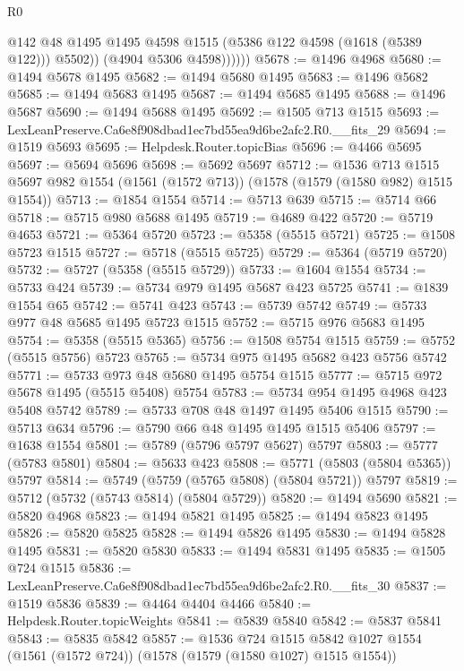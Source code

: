 \begin{lexlean}{R0}
\begin{coremodule}
                  @142
                  @48
                  @1495
                  @1495
                  @4598
                  @1515
                  (@5386 @122 @4598 (@1618 (@5389 @122)))
                  @5502))
              (@4904 @5306 @4598))))))
@5678 := @1496 @4968
@5680 := @1494 @5678 @1495
@5682 := @1494 @5680 @1495
@5683 := @1496 @5682
@5685 := @1494 @5683 @1495
@5687 := @1494 @5685 @1495
@5688 := @1496 @5687
@5690 := @1494 @5688 @1495
@5692 := @1505 @713 @1515
@5693 := LexLeanPreserve.Ca6e8f908dbad1ec7bd55ea9d6be2afc2.R0.__fits_29
@5694 := @1519 @5693
@5695 := Helpdesk.Router.topicBias
@5696 := @4466 @5695
@5697 := @5694 @5696
@5698 := @5692 @5697
@5712 := @1536
    @713
    @1515
    @5697
    @982
    @1554
    (@1561 (@1572 @713))
    (@1578 (@1579 (@1580 @982) @1515 @1554))
@5713 := @1854 @1554
@5714 := @5713 @639
@5715 := @5714 @66
@5718 := @5715 @980 @5688 @1495
@5719 := @4689 @422
@5720 := @5719 @4653
@5721 := @5364 @5720
@5723 := @5358 (@5515 @5721)
@5725 := @1508 @5723 @1515
@5727 := @5718 (@5515 @5725)
@5729 := @5364 (@5719 @5720)
@5732 := @5727 (@5358 (@5515 @5729))
@5733 := @1604 @1554
@5734 := @5733 @424
@5739 := @5734 @979 @1495 @5687 @423 @5725
@5741 := @1839 @1554 @65
@5742 := @5741 @423
@5743 := @5739 @5742
@5749 := @5733 @977 @48 @5685 @1495 @5723 @1515
@5752 := @5715 @976 @5683 @1495
@5754 := @5358 (@5515 @5365)
@5756 := @1508 @5754 @1515
@5759 := @5752 (@5515 @5756) @5723
@5765 := @5734 @975 @1495 @5682 @423 @5756 @5742
@5771 := @5733 @973 @48 @5680 @1495 @5754 @1515
@5777 := @5715 @972 @5678 @1495 (@5515 @5408) @5754
@5783 := @5734 @954 @1495 @4968 @423 @5408 @5742
@5789 := @5733 @708 @48 @1497 @1495 @5406 @1515
@5790 := @5713 @634
@5796 := @5790 @66 @48 @1495 @1495 @1515 @5406
@5797 := @1638 @1554
@5801 := @5789 (@5796 @5797 @5627) @5797
@5803 := @5777 (@5783 @5801)
@5804 := @5633 @423
@5808 := @5771 (@5803 (@5804 @5365)) @5797
@5814 := @5749 (@5759 (@5765 @5808) (@5804 @5721)) @5797
@5819 := @5712 (@5732 (@5743 @5814) (@5804 @5729))
@5820 := @1494 @5690
@5821 := @5820 @4968
@5823 := @1494 @5821 @1495
@5825 := @1494 @5823 @1495
@5826 := @5820 @5825
@5828 := @1494 @5826 @1495
@5830 := @1494 @5828 @1495
@5831 := @5820 @5830
@5833 := @1494 @5831 @1495
@5835 := @1505 @724 @1515
@5836 := LexLeanPreserve.Ca6e8f908dbad1ec7bd55ea9d6be2afc2.R0.__fits_30
@5837 := @1519 @5836
@5839 := @4464 @4404 @4466
@5840 := Helpdesk.Router.topicWeights
@5841 := @5839 @5840
@5842 := @5837 @5841
@5843 := @5835 @5842
@5857 := @1536
    @724
    @1515
    @5842
    @1027
    @1554
    (@1561 (@1572 @724))
    (@1578 (@1579 (@1580 @1027) @1515 @1554))

\end{coremodule}
\end{lexlean}
